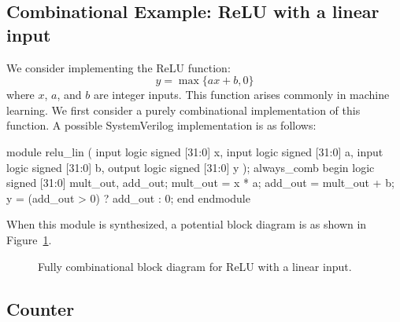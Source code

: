 \documentclass[11pt]{article}
\begin{document}
\subsection{Combinational Example: ReLU with a linear input}

We consider implementing the ReLU function:
  \[
    y = \max\{ ax + b, 0\}
  \]
  where $x$, $a$, and $b$ are integer inputs.  This function arises commonly
  in machine learning.
  We first consider a purely combinational implementation of this function.
  A possible SystemVerilog implementation is as follows:

\begin{systemverilogcode}
    module relu_lin (
      input logic signed [31:0] x,
      input logic signed [31:0] a,
      input logic signed [31:0] b,
      output logic signed [31:0] y
    );
      always_comb begin
        logic signed [31:0] mult_out, add_out;
        mult_out = x * a;
        add_out = mult_out + b;
        y = (add_out > 0) ? add_out : 0;
      end
    endmodule
  \end{systemverilogcode}

  When this module is synthesized, a potential block diagram is as shown in
  Figure~\ref{fig:relu_comb}.

  
\begin{figure}
\centering

  \caption{Fully combinational block diagram for ReLU with a linear input.}
  \label{fig:relu_comb}
\end{figure}

\subsection{Counter}
\end{document}
